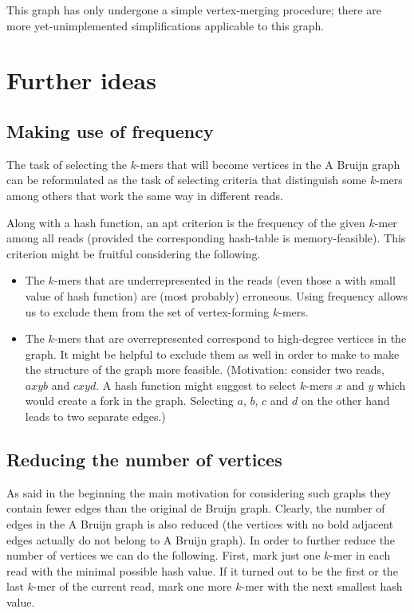 \documentclass[12pt]{article}
\begin{document}
This graph has only undergone a simple vertex-merging procedure; there are more
yet-unimplemented simplifications applicable to this graph.

\section{Further ideas}

\subsection{Making use of frequency}

The task of selecting the $k$-mers that will become vertices in the A Bruijn graph can be reformulated
as the task of selecting criteria that distinguish some $k$-mers among others that work the same way
in different reads.

Along with a hash function, an apt criterion is the frequency of the given $k$-mer among all reads
(provided the corresponding hash-table is memory-feasible). This criterion might be fruitful considering
the following.

\begin{itemize}
  \item The $k$-mers that are underrepresented in the reads (even those a with small value of hash function)
  are (most probably) erroneous. Using frequency allows us to exclude them from the set of
  vertex-forming $k$-mers.
  \item The $k$-mers that are overrepresented correspond to high-degree vertices in the graph.
  It might be helpful to exclude them as well in order to make to make the structure of the graph more feasible.
  (Motivation: consider two reads, $axyb$ and $cxyd$. A hash function might suggest to select $k$-mers $x$ and
  $y$ which would create a fork in the graph. Selecting $a$, $b$, $c$ and $d$ on the other hand leads to
  two separate edges.)
\end{itemize}

\subsection{Reducing the number of vertices}
As said in the beginning the main motivation for considering such graphs
they contain fewer edges than the original de Bruijn graph. Clearly, the number of edges in the
A Bruijn graph is also reduced (the vertices with no bold adjacent edges actually do not belong
to A Bruijn graph). In order to further reduce the number of vertices we can do the following.
First, mark just one $k$-mer in each read with the minimal possible hash value. If it turned out to be
the first or the last $k$-mer of the current read, mark one more $k$-mer with the next smallest hash 
value.
\end{document}
